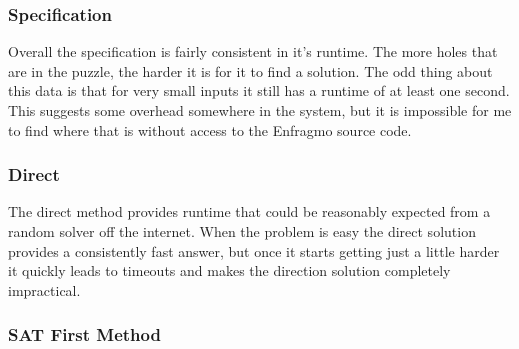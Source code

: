 \documentclass[11pt]{article} %
\begin{document}
\subsubsection{Specification}

Overall the specification is fairly consistent in it's runtime. The more holes that are in the puzzle, the harder it is for it to find a solution. The odd thing about this data is that for very small inputs it still has a runtime of at least one second. This suggests some overhead somewhere in the system, but it is impossible for me to find where that is without access to the Enfragmo source code.

\subsubsection{Direct}

The direct method provides runtime that could be reasonably expected from a random solver off the internet. When the problem is easy the direct solution provides a consistently fast answer, but once it starts getting just a little harder it quickly leads to timeouts and makes the direction solution completely impractical.

\subsubsection{SAT First Method}
\end{document}
